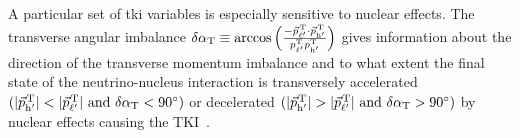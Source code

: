A particular set of \acrfull{tki} variables \cite{Lu:2018stk} is especially sensitive to nuclear effects. %
%
%
The transverse angular imbalance $\delta\alpha_\text{T} \equiv \text{arccos}\left(\frac{-\vec{p}_{\ell'}^{\hspace{.2ex} \text{T}} \cdot \vec{p}_{\text{h}'}^{\hspace{.2ex} \text{T}}}{p_{\ell'}^\text{T}p_{\text{h}'}^\text{T}}\right)$
%
%
gives information about the direction of the transverse momentum imbalance and to what extent the final state of the neutrino-nucleus interaction is transversely accelerated $(|\vec{p}_{\text{h}'}^{\hspace{.2ex} \text{T}}|
< |\vec{p}^{\hspace{.2ex} \text{T}}_{\ell'}| \ \text{and} \ \delta\alpha_\text{T} < 90^\circ)$ or decelerated
$(|\vec{p}_{\text{h}'}^{\hspace{.2ex} \text{T}}|
> |\vec{p}^{\hspace{.2ex} \text{T}}_{\ell'}| \ \text{and} \ \delta\alpha_\text{T} > 90^\circ)$ 
by nuclear effects causing the TKI~\cite{Lu:2018stk}.

\vspace{-4mm}

